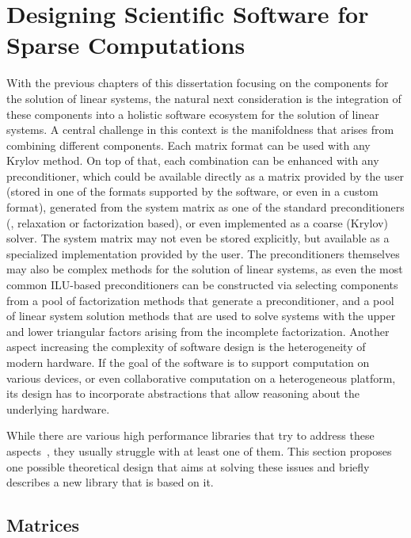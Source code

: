 \section{Designing Scientific Software for Sparse Computations}

With the previous chapters of this dissertation focusing on the components for
the solution of linear systems, the natural next consideration is the
integration of these components into a holistic software ecosystem for the
solution of linear systems.  A central challenge in this context is the
manifoldness that arises from combining different components. Each matrix format
can be used with any Krylov method. On top of that, each combination can be
enhanced with any preconditioner, which could be available directly as a matrix
provided by the user (stored in one of the formats supported by the software, or
even in a custom format), generated from the system matrix as one of the
standard preconditioners (\eg, relaxation or factorization based), or even
implemented as a coarse (Krylov) solver. The system matrix may not even be
stored explicitly, but available as a specialized implementation provided by the
user. The preconditioners themselves may also be complex methods for the
solution of linear systems, as even the most common ILU-based preconditioners
can be constructed via selecting components from a pool of factorization methods
that generate a preconditioner, and a pool of linear system solution methods
that are used to solve systems with the upper and lower triangular factors
arising from the incomplete factorization. Another aspect increasing the
complexity of software design is the heterogeneity of modern hardware. If the
goal of the software is to support computation on various devices, or even
collaborative computation on a heterogeneous platform, its design has to
incorporate abstractions that allow reasoning about the underlying hardware.

While there are various high performance libraries that try to address these
aspects~\cite{magma,vienna-cl,paralution}, they usually struggle with at least
one of them. This section proposes one possible theoretical design that aims at
solving these issues and briefly describes a new library that is based on it.

\subsection{Matrices}
\label{conclusion:ssec:matrices}

